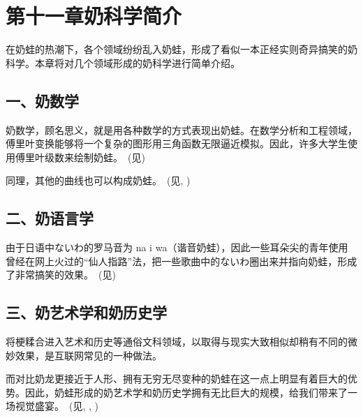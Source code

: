 
\clearpage
\section{第十一章\quad 奶科学简介}

在奶蛙的热潮下，各个领域纷纷乱入奶蛙，形成了看似一本正经实则奇异搞笑的奶科学。本章将对几个领域形成的奶科学进行简单介绍。

\subsection{一、奶数学}

奶数学，顾名思义，就是用各种数学的方式表现出奶蛙。在数学分析和工程领域，傅里叶变换能够将一个复杂的图形用三角函数无限逼近模拟。因此，许多大学生使用傅里叶级数来绘制奶蛙。~(见)



同理，其他的曲线也可以构成奶蛙。~(见, )



\clearpage


\subsection{二、奶语言学}

由于日语中ないわ的罗马音为 na i wa（谐音奶蛙），因此一些耳朵尖的青年使用曾经在网上火过的“仙人指路”法，把一些歌曲中的ないわ圈出来并指向奶蛙，形成了非常搞笑的效果。~(见)



\subsection{三、奶艺术学和奶历史学}

将梗糅合进入艺术和历史等通俗文科领域，以取得与现实大致相似却稍有不同的微妙效果，是互联网常见的一种做法。

而对比奶龙更接近于人形、拥有无穷无尽变种的奶蛙在这一点上明显有着巨大的优势。因此，奶蛙形成的奶艺术学和奶历史学拥有无比巨大的规模，给我们带来了一场视觉盛宴。~(见, , )

\clearpage


